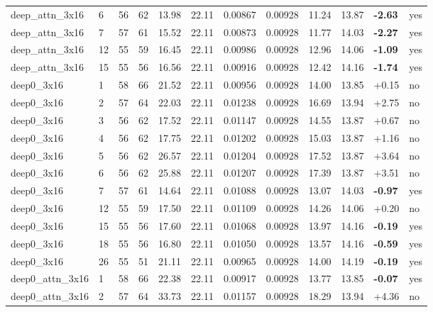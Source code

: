 \documentclass[10pt,a4paper]{article}
\begin{document}
\begin{landscape}
\begin{footnotesize}
\begin{longtable}{llllllllllll}
deep\_attn\_3x16 & 6 & 56 & 62 & 13.98 & 22.11 & 0.00867 & 0.00928 & 11.24 & 13.87 & \textbf{-2.63} & yes \\
deep\_attn\_3x16 & 7 & 57 & 61 & 15.52 & 22.11 & 0.00873 & 0.00928 & 11.77 & 14.03 & \textbf{-2.27} & yes \\
deep\_attn\_3x16 & 12 & 55 & 59 & 16.45 & 22.11 & 0.00986 & 0.00928 & 12.96 & 14.06 & \textbf{-1.09} & yes \\
deep\_attn\_3x16 & 15 & 55 & 56 & 16.56 & 22.11 & 0.00916 & 0.00928 & 12.42 & 14.16 & \textbf{-1.74} & yes \\
deep0\_3x16 & 1 & 58 & 66 & 21.52 & 22.11 & 0.00956 & 0.00928 & 14.00 & 13.85 & +0.15 & no \\
deep0\_3x16 & 2 & 57 & 64 & 22.03 & 22.11 & 0.01238 & 0.00928 & 16.69 & 13.94 & +2.75 & no \\
deep0\_3x16 & 3 & 56 & 62 & 17.52 & 22.11 & 0.01147 & 0.00928 & 14.55 & 13.87 & +0.67 & no \\
deep0\_3x16 & 4 & 56 & 62 & 17.75 & 22.11 & 0.01202 & 0.00928 & 15.03 & 13.87 & +1.16 & no \\
deep0\_3x16 & 5 & 56 & 62 & 26.57 & 22.11 & 0.01204 & 0.00928 & 17.52 & 13.87 & +3.64 & no \\
deep0\_3x16 & 6 & 56 & 62 & 25.88 & 22.11 & 0.01207 & 0.00928 & 17.39 & 13.87 & +3.51 & no \\
deep0\_3x16 & 7 & 57 & 61 & 14.64 & 22.11 & 0.01088 & 0.00928 & 13.07 & 14.03 & \textbf{-0.97} & yes \\
deep0\_3x16 & 12 & 55 & 59 & 17.50 & 22.11 & 0.01109 & 0.00928 & 14.26 & 14.06 & +0.20 & no \\
deep0\_3x16 & 15 & 55 & 56 & 17.60 & 22.11 & 0.01068 & 0.00928 & 13.97 & 14.16 & \textbf{-0.19} & yes \\
deep0\_3x16 & 18 & 55 & 56 & 16.80 & 22.11 & 0.01050 & 0.00928 & 13.57 & 14.16 & \textbf{-0.59} & yes \\
deep0\_3x16 & 26 & 55 & 51 & 21.11 & 22.11 & 0.00965 & 0.00928 & 14.00 & 14.19 & \textbf{-0.19} & yes \\
deep0\_attn\_3x16 & 1 & 58 & 66 & 22.38 & 22.11 & 0.00917 & 0.00928 & 13.77 & 13.85 & \textbf{-0.07} & yes \\
deep0\_attn\_3x16 & 2 & 57 & 64 & 33.73 & 22.11 & 0.01157 & 0.00928 & 18.29 & 13.94 & +4.36 & no \\
\bottomrule \end{longtable}
\end{footnotesize}
\end{landscape}
\end{document}

